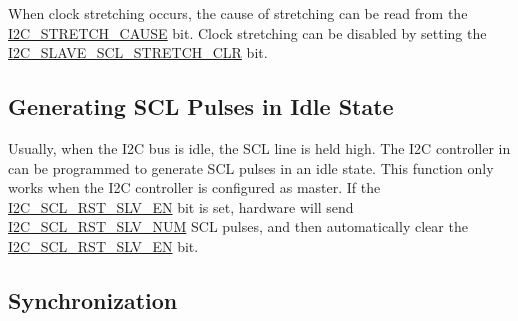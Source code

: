 \documentclass[main\_\_EN.tex]{subfiles}
\begin{document}
When clock stretching occurs, the cause of stretching can be read from the \hyperref[fielddesc:I2CSTRETCHCAUSE]{I2C\_STRETCH\_CAUSE} bit. Clock stretching can be disabled by setting the \hyperref[fielddesc:I2CSLAVESCLSTRETCHCLR]{I2C\_SLAVE\_SCL\_STRETCH\_CLR} bit.

\subsection{Generating SCL Pulses in Idle State}

Usually, when the I2C bus is idle, the SCL line is held high. The I2C controller in \chipname{} can be programmed to generate SCL pulses in an idle state. This function only works when the I2C controller is configured as master. If the \hyperref[fielddesc:I2CSCLRSTSLVEN]{I2C\_SCL\_RST\_SLV\_EN} bit is set, hardware will send \hyperref[fielddesc:I2CSCLRSTSLVNUM]{I2C\_SCL\_RST\_SLV\_NUM} SCL pulses, and then automatically clear the \hyperref[fielddesc:I2CSCLRSTSLVEN]{I2C\_SCL\_RST\_SLV\_EN} bit.

\subsection{Synchronization}
\end{document}
